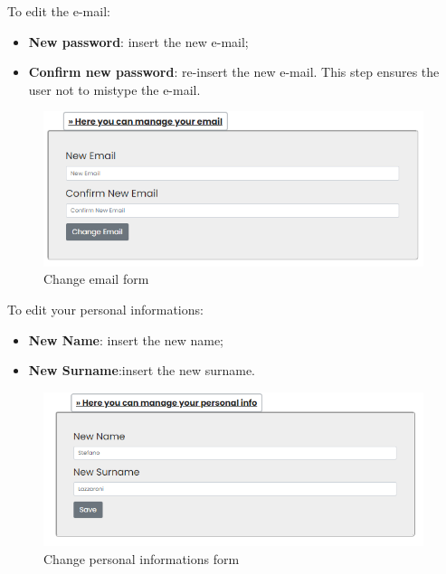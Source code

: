 To edit the e-mail:
\begin{itemize} 
    \item \textbf{New password}: insert the new e-mail; 
    \item \textbf{Confirm new password}: re-insert the new e-mail. This step ensures the user not to  mistype the e-mail.
\end{itemize}

\begin{figure}[H]
    \centering
    \includegraphics[width=30em]{res/images/cliente/credentialemail.png}
    \caption{Change email form}
\end{figure}

To edit your personal informations:
\begin{itemize} 
    \item \textbf{New Name}: insert the new name; 
    \item \textbf{New Surname}:insert the new surname.
\end{itemize}

\begin{figure}[H]
    \centering
    \includegraphics[width=30em]{res/images/cliente/personalinfo.png}
    \caption{Change personal informations form}
\end{figure}


